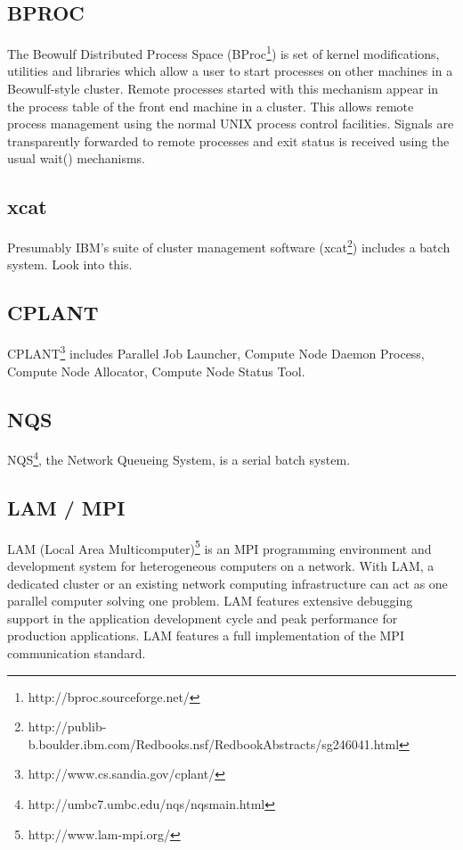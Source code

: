 \subsection{BPROC}


The Beowulf Distributed Process Space 
(BProc\footnote{http://bproc.sourceforge.net/})
is set of kernel
modifications, utilities and libraries which allow a user to start
processes on other machines in a Beowulf-style cluster.  Remote
processes started with this mechanism appear in the process table
of the front end machine in a cluster. This allows remote process
management using the normal UNIX process control facilities. Signals
are transparently forwarded to remote processes and exit status is
received using the usual wait() mechanisms.

\subsection{xcat}

Presumably IBM's suite of cluster management software 
(xcat\footnote{http://publib-b.boulder.ibm.com/Redbooks.nsf/RedbookAbstracts/sg246041.html})
includes a batch system.  Look into this.

\subsection{CPLANT}

CPLANT\footnote{http://www.cs.sandia.gov/cplant/} includes
Parallel Job Launcher, Compute Node Daemon Process,
Compute Node Allocator, Compute Node Status Tool.

\subsection{NQS} 

NQS\footnote{http://umbc7.umbc.edu/nqs/nqsmain.html}, 
the Network Queueing System, is a serial batch system.

\subsection{LAM / MPI}

LAM (Local Area Multicomputer)\footnote{http://www.lam-mpi.org/}
is an MPI programming environment and development system for heterogeneous 
computers on a network. 
With LAM, a dedicated cluster or an existing network
computing infrastructure can act as one parallel computer solving
one problem.  LAM features extensive debugging support in the
application development cycle and peak performance for production
applications. LAM features a full implementation of the MPI
communication standard.


